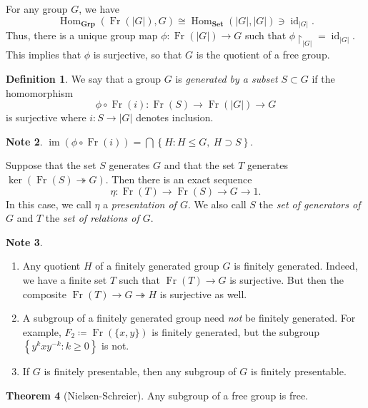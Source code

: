\documentclass[10pt,letterpaper,cm]{nupset}
\theoremstyle{definition}
\newtheorem{definition}{Definition}[subsection]
\newtheorem{note}[definition]{Note}
\theoremstyle{theorem}
\newtheorem{theorem}[definition]{Theorem}
\theoremstyle{remark}
\newcommand{\1}{\mathbf{1}}
\newcommand{\0}{\vec 0}
\DeclareMathOperator{\id}{\mathrm{id}}
\DeclareMathOperator{\im}{im}
\DeclareMathOperator{\Hom}{Hom}
\DeclareMathOperator{\Fr}{Fr}
\begin{document}
For any group $G$, we have $$\Hom_{\mathbf{Grp}}(\Fr(\left\lvert{G}\right\rvert), G) \cong \Hom_{\mathbf{Set}}(\left\lvert{G}\right\rvert, \left\lvert{G}\right\rvert)\ni \id_{\left\lvert{G}\right\rvert}.$$ Thus, there is a unique group map $\phi : \Fr(\left\lvert{G}\right\rvert) \to G$ such that $\phi \restriction_{\left\lvert{G}\right\rvert} = \id_{\left\lvert{G}\right\rvert}$. This implies that $\phi$ is surjective, so that $G$ is the quotient of a free group.


\begin{definition}
We say that a group $G$ is \textit{generated by a subset $S\subset G$} if the homomorphism $$\phi \circ \Fr(i):\Fr(S) \to \Fr(\left\lvert{G}\right\rvert) \to G$$ is surjective where $i: S \to \left\lvert{G}\right\rvert$ denotes inclusion.
\end{definition}

\begin{note}
$\im(\phi \circ \Fr(i)) = \bigcap{\left\{H : H \leq G, \ H \supset S\right\}}$.
\end{note}

\medskip

Suppose that the set $S$ generates $G$ and that the set $T$ generates $\ker(\Fr(S) \twoheadrightarrow G)$. Then there is an exact sequence $$\eta :  \Fr(T) \to \Fr(S) \to G \to 1.$$ In this case, we call $\eta$ a \textit{presentation of $G$}. We also call $S$ the \textit{set of generators of $G$} and $T$ the \textit{set of relations of $G$}.



\begin{note} $ $
\begin{enumerate}
\item Any quotient $H$ of a finitely generated group $G$ is finitely generated. Indeed, we have a finite set $T$ such that $\Fr(T) \to G$ is surjective. But then the composite $\Fr(T) \to G \twoheadrightarrow H$ is surjective as well.
\item A subgroup of a finitely generated group need \emph{not} be finitely generated. For example, $F_2\coloneqq \Fr(\{x,y\})$ is finitely generated, but the subgroup $\left\{y^kxy^{-k} : k \geq 0\right\}$ is not.
\item If $G$ is finitely presentable, then any subgroup of $G$ is finitely presentable.
\end{enumerate}  
\end{note}

\begin{theorem}[Nielsen-Schreier]
Any subgroup of a free group is free.
\end{theorem}
\end{document}
